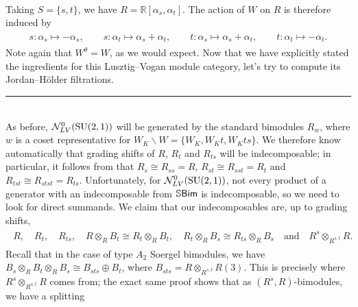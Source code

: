 \begin{example}
\begin{align*}
\begin{split}
\end{split}
\end{align*}
\noindent Taking $S = \{s, t\}$, we have $R = \mathbb{R}[\alpha_s, \alpha_t]$. The action of $W$ on $R$ is therefore induced by
\begin{align*}
\begin{split}
s : \alpha_s \mapsto -\alpha_s,\qquad s : \alpha_t \mapsto \alpha_s + \alpha_t,\qquad t : \alpha_s \mapsto \alpha_s + \alpha_t,\qquad t : \alpha_t \mapsto -\alpha_t.
\end{split}
\end{align*}
\noindent Note again that $W^\theta = W$, as we would expect. Now that we have explicitly stated the ingredients for this Lusztig--Vogan module category, let's try to compute its Jordan--H\"{o}lder filtrations.\\[-1.5\baselineskip]
\begin{center}
\rule{0.5\linewidth}{1pt}
\end{center}
\noindent\\[-\baselineskip]
\noindent As before, $\mathcal{N}_{LV}^0(\textup{SU}(2, 1))$ will be generated by the standard bimodules $R_w$, where $w$ is a coset representative for $W_K\backslash W = \{W_K, W_Kt, W_Kts\}$. We therefore know automatically that grading shifts of $R$, $R_t$ and $R_{ts}$ will be indecomposable; in particular, it follows from \cite[Lemma 6.2.3]{LR22} that $R_s \cong R_{ss} = R$, $R_{st} \cong R_{sst} = R_t$ and $R_{tst} \cong R_{stst} = R_{ts}$. Unfortunately, for $\mathcal{N}_{LV}^0(\textup{SU}(2, 1))$, not every product of a generator with an indecomposable from $\mathbb{S}\textup{\textsf{Bim}}$ is indecomposable, so we need to look for direct summands. We claim that our indecomposables are, up to grading shifts,
\begin{align*}
\begin{split}
R,\quad R_t,\quad R_{ts},\quad R \otimes_R B_t \cong R_t \otimes_R B_t,\quad R_t \otimes_R B_s \cong R_{ts} \otimes_R B_s\quad\text{and}\quad R^s \otimes_{R^{s,t}} R.
\end{split}
\end{align*}
\noindent Recall that in the case of type $A_2$ Soergel bimodules, we have $B_s \otimes_R B_t \otimes_R B_s \cong B_{sts} \oplus B_t$, where $B_{sts} = R \otimes_{R^{s,t}} R(3)$. This is precisely where $R^s \otimes_{R^{s,t}} R$ comes from; the exact same proof shows that as $(R^s, R)$-bimodules, we have a splitting

\end{example}
